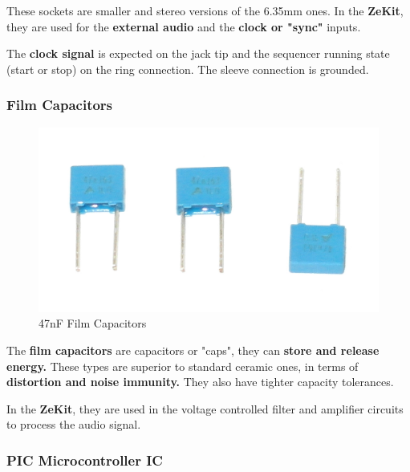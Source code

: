 \documentclass{scrartcl}
\begin{document}
These sockets are smaller and stereo versions of the 6.35mm ones. In the \textbf{ZeKit}, they are used for the \textbf{external audio} and the \textbf{clock or "sync"} inputs.

The \textbf{clock signal} is expected on the jack tip and the sequencer running state (start or stop) on the ring connection. The sleeve connection is grounded.

\subsubsection{Film Capacitors}

\begin{figure}[!ht]
    \begin{center}
        \includegraphics[scale=0.15]{assets/zekit-caps.jpg}
        \caption{47nF Film Capacitors}
    \end{center}
\end{figure}

The \textbf{film capacitors} are capacitors or "caps", they can \textbf{store and release energy.} These types are superior to standard ceramic ones, in terms of \textbf{distortion and noise immunity.}
They also have tighter capacity tolerances.

In the \textbf{ZeKit}, they are used in the voltage controlled filter and amplifier circuits to process the audio signal.

\pagebreak
\subsubsection{PIC Microcontroller IC}
\end{document}
